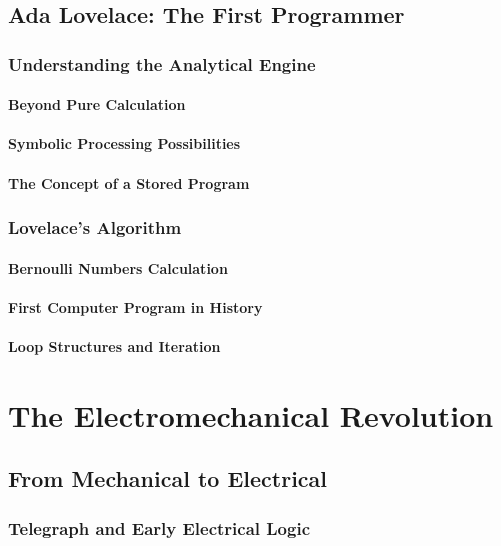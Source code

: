 \documentclass[12pt, oneside, openany]{book}
\begin{document}
\section{Ada Lovelace: The First Programmer}
\subsection{Understanding the Analytical Engine}
\subsubsection{Beyond Pure Calculation}
\subsubsection{Symbolic Processing Possibilities}
\subsubsection{The Concept of a Stored Program}

\subsection{Lovelace's Algorithm}
\subsubsection{Bernoulli Numbers Calculation}
\subsubsection{First Computer Program in History}
\subsubsection{Loop Structures and Iteration}


\chapter{The Electromechanical Revolution}

\section{From Mechanical to Electrical}
\subsection{Telegraph and Early Electrical Logic}
\end{document}
